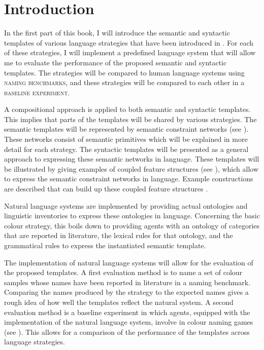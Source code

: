 \section*{Introduction}

In the first part of this book, I will introduce the semantic and
syntactic templates of various language strategies that have been
introduced in . For each of these
strategies, I will implement a predefined language system that will
allow me to evaluate the performance of the proposed semantic and
syntactic templates. The strategies will be compared to human language
systems using \textsc{naming benchmarks}, and these strategies will be
compared to each other in a \textsc{baseline experiment}.

A compositional approach is applied to both
semantic and syntactic
  templates. This implies that parts of the
templates will be shared by various strategies. The semantic templates
will be represented by semantic constraint networks (see ). These networks consist of
semantic primitives which will be explained in more detail for each
strategy. The syntactic templates will be presented as a general
approach to expressing these semantic networks in language. These
templates will be illustrated by giving examples of coupled feature
structures (see ), which
allow to express the semantic constraint networks in language. Example
constructions are described that can build up these coupled feature
structures \citep{bleys06next, steels07emergence, bleys08expressing}.

Natural language systems are implemented by providing actual
ontologies and linguistic inventories to express these ontologies in
language. Concerning the basic colour strategy, this boils down to providing
agents with an ontology of categories that are reported in literature,
the lexical rules for that ontology, and the grammatical rules to
express the instantiated semantic template.

The implementation of natural language systems will allow for the
evaluation of the proposed templates. A first evaluation method is to
name a set of colour samples whose names have been reported in
literature in a naming benchmark. 
Comparing the names produced by the strategy to the
expected names gives a rough idea of how well the templates reflect
the natural system. A second evaluation method is a baseline
  experiment in which agents, equipped
with the implementation of the natural language system, involve in
colour naming games (see ). This allows for a comparison of
the performance of the templates across language strategies.

\newpage
\thispagestyle{empty}
